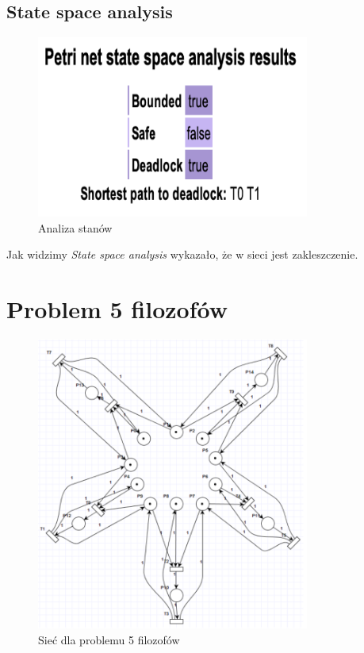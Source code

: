 \documentclass{article}
\begin{document}
\subsection{State space analysis}
\begin{figure}[H]
    \centering
    \includegraphics[width=0.8\textwidth, height=0.4\textheight]{zad7_analiza.png}
    \caption{Analiza stanów}
\end{figure}

Jak widzimy \textit{State space analysis} wykazało, że w sieci jest zakleszczenie.

\section{Problem 5 filozofów}
\begin{figure}[H]
    \centering
    \includegraphics[width=0.8\textwidth, height=0.7\textheight]{zad8.png}
    \caption{Sieć dla problemu 5 filozofów}
\end{figure}
\end{document}
